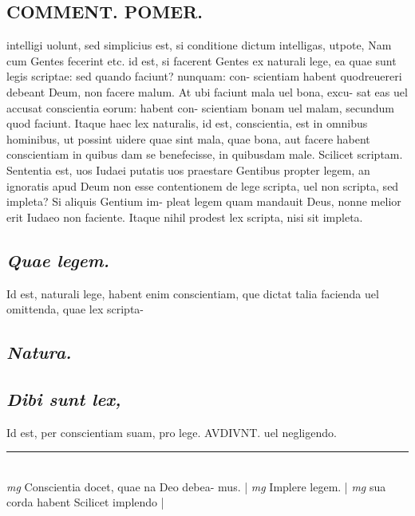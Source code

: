 \documentclass{article}
\begin{document}
\begin{pages}
\section*{COMMENT. POMER.  }\pstart intelligi uolunt, sed simplicius est, si conditione dictum intelligas, utpote, Nam cum Gentes fecerint etc. id est, si facerent Gentes ex naturali lege, ea quae sunt legis scriptae: sed quando faciunt? nunquam: con- scientiam habent quodreuereri debeant Deum, non facere malum. At ubi faciunt mala uel bona, excu- sat eas uel accusat conscientia eorum: habent con- scientiam bonam uel malam, secundum quod faciunt.  Itaque haec lex naturalis, id est, conscientia, est in omnibus hominibus, ut possint uidere quae sint mala, quae bona, aut facere habent conscientiam in quibus dam se benefecisse, in quibusdam male.  \pend\pstart Scilicet scriptam. Sententia est, uos Iudaei putatis uos praestare Gentibus propter legem, an ignoratis apud Deum non esse contentionem de lege scripta, uel non scripta, sed impleta? Si aliquis Gentium im- pleat legem quam mandauit Deus, nonne melior erit Iudaeo non faciente. Itaque nihil prodest lex scripta, nisi sit impleta.   \pend
{}
{}
\subsection*{\textit{Quae legem. }}\pstart Id est, naturali lege, habent enim conscientiam, que dictat talia facienda uel omittenda, quae lex scripta-  \pend
{}
{}
\subsection*{\textit{Natura. }}
{}
\subsection*{\textit{Dibi sunt lex, }}\pstart Id est, per conscientiam suam, pro lege. AVDIVNT.  uel negligendo.  \pend
\vspace{0.5cm}\noindent
\vspace{0.2cm}\rule{1cm}{0.2pt}\\ 
\hspace{0.2cm}\textit{mg}
\footnotesize Conscientia docet, quae na Deo debea- mus. 
\normalsize| 
\hspace{0.2cm}\textit{mg}
\footnotesize Implere legem.  
\normalsize| 
\hspace{0.2cm}\textit{mg}
\footnotesize sua corda habent Scilicet implendo 
\normalsize| 

\end{pages}
\end{document}
